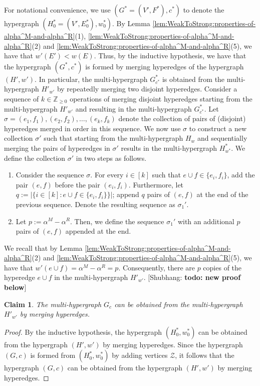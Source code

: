 \documentclass{article}
\newtheorem{claim}{Claim}[section]
\newcommand{\zeros}{\ensuremath{\mathcal{Z}}\xspace}
\newcommand{\shubhang}[1]{{\color{blue}[{\tiny Shubhang: \bf #1}]\marginpar{\color{blue}*}}}
\providecommand{\Z}{\mathbb{Z}}
\begin{document}
    \iffalse
    For notational convenience, we use  $(G^* = (V', F^*), c^*)$ to denote the  hypergraph $ (H_0^* = (V', E_0^*), w_0^*)$. By Lemma \ref{lem:WeakToStrong:properties-of-alpha^M-and-alpha^R}(1), \ref{lem:WeakToStrong:properties-of-alpha^M-and-alpha^R}(2) and \ref{lem:WeakToStrong:properties-of-alpha^M-and-alpha^R}(5), we have that $w'(E') < w(E)$. Thus, by the inductive hypothesis, we have that the hypergraph $(G^*, c^*)$ is formed by merging hyperedges of the hypergraph $(H', w')$. In particular, the multi-hypergraph $G^*_{c^*}$ is obtained from the multi-hypergraph $H'_{w'}$ by repeatedly merging two disjoint hyperedges. Consider a sequence of $k \in \Z_{\geq 0}$ operations of merging disjoint hyperedges starting from the multi-hypergraph $H'_{w'}$ and resulting in the multi-hypergraph $G^*_{c^*}$. Let $\sigma = (e_1, f_1), (e_2, f_2), \ldots, (e_k, f_k)$ denote the collection of pairs of (disjoint) hyperedges merged in order in this sequence. We now use $\sigma$ to construct a new collection $\sigma'$ such that starting from the multi-hypergraph $H_w$ and sequentially merging the pairs of hyperedges in $\sigma'$   results in the multi-hypergraph $H^*_{w^*}$. We define the collection $\sigma'$ in two steps as follows.
    \begin{enumerate}
        \item Consider the sequence $\sigma$. For every $i \in [k]$ such that $e\cup f \in \{e_i, f_i\}$, add the pair $(e, f)$ before the pair $(e_i, f_i)$. Furthermore, let $q := |\{i \in [k] : e\cup f \in \{e_i, f_i\}\}|$; append $q$ pairs of $(e, f)$ at the end of the previous sequence. Denote the resulting sequence as $\sigma_1'$.
        \item Let $p := \alpha^M - \alpha^R$. Then, we define the sequence $\sigma_1'$ with an additional $p$ pairs of $(e, f)$ appended at the end.
    \end{enumerate}
    
    We recall that by Lemma \ref{lem:WeakToStrong:properties-of-alpha^M-and-alpha^R}(2) and \ref{lem:WeakToStrong:properties-of-alpha^M-and-alpha^R}(5), we have that $w'(e\cup f) = \alpha^M - \alpha^R = p$. Consequently, there are $p$ copies of the hyperedge $e\cup f$ in the multi-hypergraph $H'_{w'}$. 
\shubhang{todo: new proof below}
    \begin{claim}
        The multi-hypergraph $G_c$ can be obtained from the multi-hypergraph $H'_{w'}$ by merging hyperedges.
    \end{claim}
    \begin{proof}
        By the inductive hypothesis, the hypergraph $(H^*_0, w^*_0)$ can be obtained from the hypergraph $(H', w')$ by merging hyperedges. Since the hypergraph $(G, c)$ is formed from $(H_0^*, w_0^*)$ by adding vertices $\zeros$, it follows that the hypergraph $(G, c)$ can be obtained from the hypergraph $(H', w')$ by merging hyperedges.            
    \end{proof}
\end{document}
